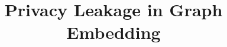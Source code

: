 \documentclass[conference]{IEEEtran}
\begin{document}

\title{Privacy Leakage in Graph Embedding}






\maketitle

\begin{abstract}






\end{abstract}
\end{document}
